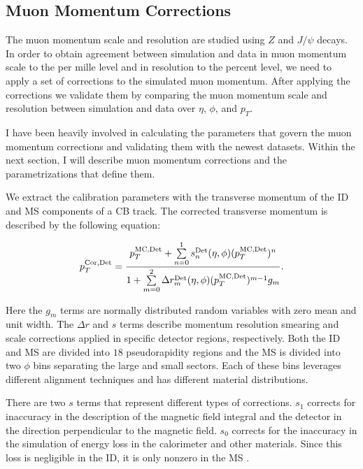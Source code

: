 \subsection{Muon Momentum Corrections} 
\par \hspace{20pt} The muon momentum scale and resolution are studied using $Z$ and $J/\psi$ decays. In order to obtain agreement between simulation and data in muon momentum scale to the per mille level and in resolution to the percent level, we need to apply a set of corrections to the simulated muon momentum. After applying the corrections we validate them by comparing the muon momentum scale and resolution between simulation and data over $\eta$, $\phi$, and $p_T$.

\par \hspace{20pt} I have been heavily involved in calculating the parameters that govern the muon momentum corrections and validating them with the newest datasets. Within the next section, I will describe muon momentum corrections and the parametrizations that define them.

\par \hspace{20pt} We extract the calibration parameters with the transverse momentum of the ID and MS components of a CB track.  The corrected transverse momentum is described by the following equation: 

\begin{align*}
	\centering 
    p_T^{\textrm{Cor,Det}} = \frac{p_T^{\textrm{MC,Det}}+\sum\limits_{n=0}^1s_n^{\textrm{Det}}(\eta,\phi)(p_T^{\textrm{MC,Det}})^n}{1+\sum\limits_{m=0}^2\Delta r_m^{\textrm{Det}}(\eta,\phi)(p_T^{\textrm{MC,Det}})^{m-1}g_m} .
\end{align*}
\par \hspace{20pt} Here the $g_m$ terms are normally distributed random variables with zero mean and unit width. The $\Delta r $ and $s$ terms describe momentum resolution smearing and scale corrections applied in specific detector regions, respectively. Both the ID and MS are divided into $18$ pseudorapidity regions and the MS is divided into two $\phi$ bins separating the large and small sectors. Each of these bins leverages different alignment techniques and has different material distributions. 

\par \hspace{20pt} There are two $s$ terms that represent different types of corrections. $s_1$ corrects for inaccuracy in the description of the magnetic field integral and the detector in the direction perpendicular to the magnetic field. $s_0$ corrects for the inaccuracy in the simulation of energy loss in the calorimeter and other materials. Since this loss is negligible in the ID, it is only nonzero in the MS \cite{MCPpaper}.

